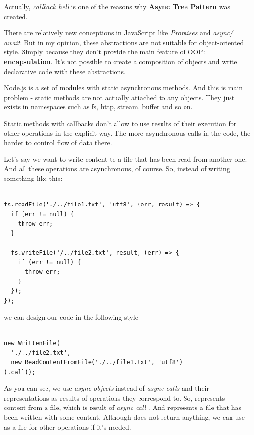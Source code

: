 \documentclass{article}
\newcommand{\cit}[1]{{\fontfamily{qcr}\selectfont{\textit{\textcolor{superdarkgray}{#1}}}}}
\begin{document}
Actually, \textit{callback hell} is one of the reasons why \textbf{Async Tree Pattern} was created.

There are relatively new conceptions in JavaScript like \textit{Promises} and  \textit{async/ await}. But in my opinion, these abstractions are not suitable for object-oriented style. Simply because they don't provide the main feature of OOP: \textbf{encapsulation}. 
It's not possible to create a composition of objects and write declarative code with these abstractions.

Node.js is a set of modules with static asynchronous methods. And this is main problem - static methods are not actually attached to any objects. They just exists in namespaces such as fs, http, stream, buffer and so on.

Static methods with callbacks don't allow to use results of their execution for other operations in the explicit way. The more asynchronous calls in the code, the harder to control flow of data there.

Let's say we want to write content to a file that has been read from another one. And all these operations are asynchronous, of course. 
So, instead of writing something like this:

\newpage

\begin{lstlisting}

fs.readFile('./../file1.txt', 'utf8', (err, result) => {
  if (err != null) {
    throw err;
  }
 
  fs.writeFile('/../file2.txt', result, (err) => {
    if (err != null) {
      throw err;
    }
  });
});

\end{lstlisting}

we can design our code in the following style:

\begin{lstlisting}

new WrittenFile(
  './../file2.txt',
  new ReadContentFromFile('./../file1.txt', 'utf8')
).call();

\end{lstlisting}

As you can see, we use \textit{async objects} instead of \textit{async calls} and their representations as results of operations they correspond to. So, \cit{ReadContentFromFile} represents \cit{string} - content from a file, which is result of \textit{async call} \cit{fs.readFile}. And \cit{WrittenFile} represents a file that has been written with some content. Although \cit{fs.WriteFile} does not return anything, we can use \cit{WrittenFile} as a file for other operations if it's needed.
\end{document}
